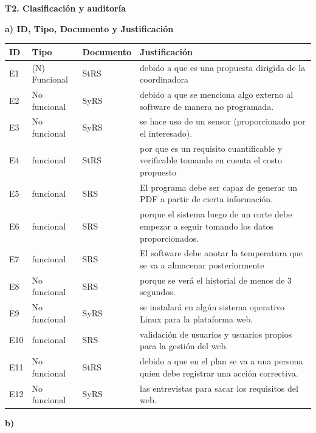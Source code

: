 \documentclass[11pt]{article}
\begin{document}
	\begin{cajarespuesta}[title={Respuestas del estudiante: T2}]
		\textbf{T2. Clasificación y auditoría}
		
		\textbf{a) ID, Tipo, Documento y Justificación}
		
		\begin{longtable}{|p{0.8cm}|p{2.2cm}|p{2.2cm}|p{8cm}|}
			\hline
			ID & Tipo & Documento & Justificación\\ \hline
			E1 & (N) Funcional & StRS & debido a que es una propuesta dirigida de la coordinadora\\ \hline
			E2 & No funcional & SyRS & debido a que se menciona algo externo al software de manera no programada.\\ \hline
			E3 & No funcional & SyRS & se hace uso de un sensor (proporcionado por el interesado).\\ \hline
			E4 & funcional & StRS & por que es un requisito cuantificable y verificable tomando en cuenta el costo propuesto\\ \hline
			E5 & funcional & SRS & El programa debe ser capaz de generar un PDF a partir de cierta información.\\ \hline
			E6 & funcional & SRS & porque el sistema luego de un corte debe empezar a seguir tomando los datos proporcionados.\\ \hline
			E7 & funcional & SRS & El software debe anotar la temperatura que se va a almacenar posteriormente\\ \hline
			E8 & No funcional & SRS & porque se verá el historial de menos de 3 segundos.\\ \hline
			E9 & No funcional & SyRS & se instalará en algún sistema operativo Linux para la plataforma web.\\ \hline
			E10 & funcional & SRS & validación de usuarios y usuarios propios para la gestión del web.\\ \hline
			E11 & No funcional & StRS & debido a que en el plan se va a una persona quien debe registrar una acción correctiva.\\ \hline
			E12 & No funcional & SyRS & las entrevistas para sacar los requisitos del web.\\ \hline
		\end{longtable}
		
		\textbf{b)}
		

\end{cajarespuesta}
\end{document}
